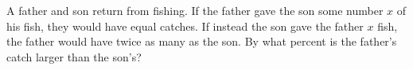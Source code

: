A father and son return from fishing. If the father gave the son some number $x$ of his fish, they would have equal catches. If instead the son gave the father $x$ fish, the father would have twice as many as the son. By what percent is the father's catch larger than the son's?
